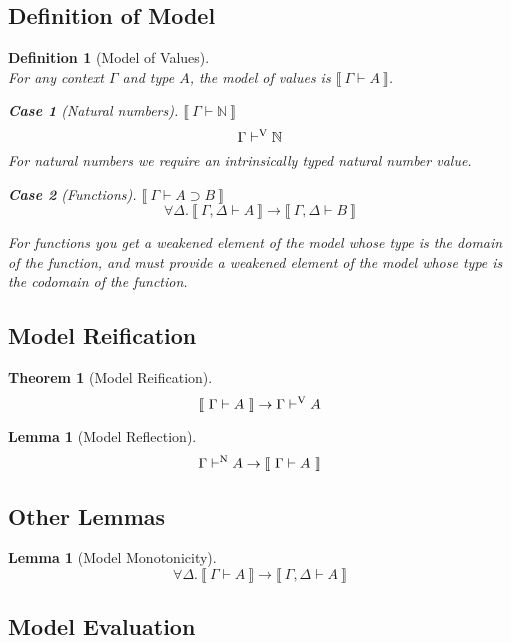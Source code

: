 \documentclass[preprint,nonatbib]{sigplanconf}
\newtheorem{defin}{Definition}
\newtheorem{subdefin}{Case}
\numberwithin{subdefin}{defin}
\newtheorem{theorem}{Theorem}
\newtheorem{subtheorem}{Lemma}
\numberwithin{subtheorem}{theorem}
\newtheorem{lemma}{Lemma}
\def\arr{\supset}
\def\marr{\rightarrow}
\def\nat{\mathbb{N}}
\newcommand{\turn}[1]{\vdash^\con{#1}}
\newcommand{\all}[1]{\forall#1.~}
\newcommand{\el}[1]{\llbracket ~ #1 ~ \rrbracket}
\newcommand{\con}[1]{\textmd{#1}}
\newcommand{\typm}[1]{\el{\Gamma \vdash #1}}
\newcommand{\gdtypm}[1]{\el{\Gamma, \Delta \vdash #1}}
\newcommand{\typv}[1]{\Gamma \turn{V} #1}
\newcommand{\typn}[1]{\Gamma \turn{N} #1}
\begin{document}

\subsection{Definition of Model}

\begin{defin}[Model of Values]
\label{def:mod}
$ $\\
For any context $\Gamma$ and type $A$, the model of values is
$\typm{A}$.

\begin{subdefin}[Natural numbers]
$\typm{\nat}$
$$
\typv{\nat}
$$
For natural numbers we require an intrinsically typed natural number
value.
\end{subdefin}

\begin{subdefin}[Functions]
$\typm{A \arr B}$
$$
\all{\Delta} \gdtypm{A} \marr \gdtypm{B}
$$

For functions you get a weakened element of the model whose type is
the domain of the function, and must provide a weakened element of the
model whose type is the codomain of the function.
\end{subdefin}

\end{defin}

\subsection{Model Reification}

\begin{theorem}[Model Reification]
\label{thm:mod:reify}
$$
\typm{A} \marr \typv{A}
$$
\end{theorem}

\begin{subtheorem}[Model Reflection]
\label{lem:mod:refl}
$$
\typn{A} \marr \typm{A}
$$
\end{subtheorem}

\subsection{Other Lemmas}

\begin{lemma}[Model Monotonicity]
\label{lem:mod:mono}
$$
\all{\Delta} \typm{A} \marr \gdtypm{A}
$$
\end{lemma}

\subsection{Model Evaluation}
\end{document}

